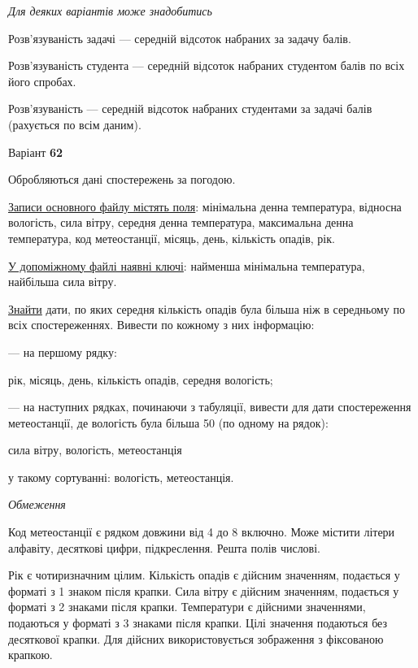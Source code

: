 \documentclass[11pt, ukrainian]{article}
\begin{document}
\bigskip\textit{Для деяких варіантів може знадобитись}

Розв'язуваність задачі --- середній відсоток набраних за задачу балів.

Розв'язуваність студента --- середній відсоток набраних студентом балів по всіх його спробах.

Розв'язуваність --- середній відсоток набраних студентами за задачі балів (рахується по всім даним).




\par
\newpage
{\center Варіант  \No \textbf { 62 }\par}
\bigskip
Обробляються дані спостережень за погодою. 

\underline{Записи основного файлу містять поля}: мінімальна денна температура, відносна вологість, сила вітру, середня денна температура, максимальна денна температура, код метеостанції, місяць, день, кількість опадів, рік.

\underline{У допоміжному файлі наявні ключі}: найменша мінімальна температура, найбільша сила вітру.

\underline{Знайти} дати, по яких середня кількість опадів була більша ніж в середньому по всіх спостереженнях. Вивести по кожному з них інформацію:\par
{\noindent}--- на першому рядку:\par
рік, місяць, день, кількість опадів, середня вологість;

{\noindent}--- на наступних рядках, починаючи з табуляції, вивести для дати спостереження метеостанції, де вологість була більша 50 (по одному на рядок):\par
сила вітру, вологість, метеостанція

{\noindent}у такому сортуванні: вологість, метеостанція.


\bigskip\textit{Обмеження}

Код метеостанції є рядком довжини від 4 до 8 включно.
Може містити літери алфавіту, десяткові цифри, підкреслення. Решта полів числові.

Рік є чотиризначним цілим.
Кількість опадів є дійсним значенням, подається у форматі з 1 знаком після крапки.
Сила вітру є дійсним значенням, подається у форматі з 2 знаками після крапки.
Температури є дійсними значеннями, подаються у форматі з 3 знаками після крапки.
Цілі значення подаються без десяткової крапки.
Для дійсних використовується зображення з фіксованою крапкою.
\end{document}
